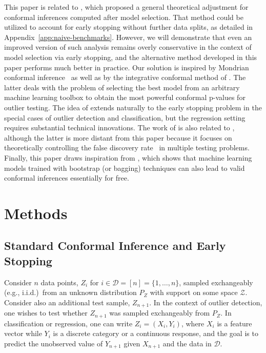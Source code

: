 This paper is related to \citet{efficiency_first_cp}, which proposed a general theoretical adjustment for conformal inferences computed after model selection. That method could be utilized to account for early stopping without further data splits, as detailed in Appendix~\ref{app:naive-benchmarks}. However, we will demonstrate that even an improved version of such analysis remains overly conservative in the context of model selection via early stopping, and the alternative method developed in this paper performs much better in practice.
Our solution is inspired by Mondrian conformal inference~\citep{vovk2003mondrian} as well as by the integrative conformal method of \citet{Liang_2022_integrative_p_val}. The latter deals with the problem of selecting the best model from an arbitrary machine learning toolbox  to obtain the most powerful conformal p-values for outlier testing. The idea of \citet{Liang_2022_integrative_p_val} extends naturally to the early stopping problem in the special cases of outlier detection and classification, but the regression setting requires substantial technical innovations.
The work of \citet{Liang_2022_integrative_p_val} is also related to \citet{marandon2022machine}, although the latter is more distant from this paper because it focuses on theoretically controlling the false discovery rate~\cite{benjamini1995controlling}  in multiple testing problems.
Finally, this paper draws inspiration from \citet{kim2020predictive}, which shows that machine learning models trained with bootstrap (or bagging) techniques can also lead to valid conformal inferences essentially for free.


\section{Methods} \label{sec:ces}

\subsection{Standard Conformal Inference and Early Stopping} \label{sec:setup}

Consider $n$ data points, $Z_i$ for $i \in \mathcal{D} = [n] = \{1,\ldots,n\}$, sampled exchangeably (e.g., i.i.d.)~from an unknown distribution $P_{Z}$ with support on some space $\mathcal{Z}$. Consider also an additional test sample, $Z_{n+1}$. 
In the context of outlier detection, one wishes to test whether $Z_{n+1}$ was sampled exchangeably from $P_Z$.
In classification or regression, one can write $Z_i = (X_i, Y_i)$, where $X_i$ is a feature vector while $Y_i$ is a discrete category or a continuous response, and the goal is to predict the unobserved value of $Y_{n+1}$ given $X_{n+1}$ and the data in $\mathcal{D}$.

